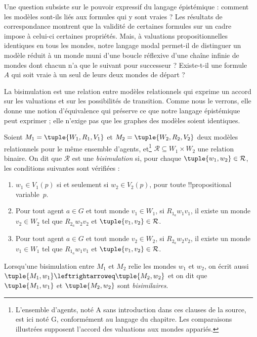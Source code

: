 \documentclass[../../../include/open-logic-section]{subfiles}
\begin{document}


Une question subsiste sur le pouvoir expressif du langage épistémique :
comment les modèles sont-ils liés aux formules qui y sont vraies ?
Les résultats de correspondance montrent que la validité de certaines
formules sur un cadre impose à celui-ci certaines propriétés. Mais,
à valuations propositionnelles identiques en tous les mondes, notre
langage modal permet-il de distinguer un modèle réduit à un monde
muni d'une boucle réflexive d'une chaîne infinie de mondes dont chacun
n'a que le suivant pour successeur ? Existe-t-il une formule $A$ qui
soit vraie à un seul de leurs deux mondes de départ ?

La bisimulation est une relation entre modèles relationnels qui
exprime un accord sur les valuations et sur les possibilités de
transition. Comme nous le verrons, elle donne une notion d'équivalence
qui préserve ce que notre langage épistémique peut exprimer ; elle
n'exige pas que les graphes des modèles soient identiques.

\begin{defn}[Bisimulation]
Soient $M_1 = \tuple{W_1, R_1, V_1}$ et $M_2 = \tuple{W_2, R_2, V_2}$
deux modèles relationnels pour le même ensemble d'agents, et\footnote{L'ensemble d'agents, noté A sans introduction dans ces clauses de la source, est ici noté G, conformément au langage du chapitre. Les comparaisons illustrées supposent l'accord des valuations aux mondes appariés.}
$\mathcal{R} \subseteq W_1 \times W_2$ une relation binaire.
On dit que $\mathcal{R}$ est une \emph{bisimulation} si, pour chaque
$\tuple{w_1, w_2} \in \mathcal{R}$, les conditions suivantes sont vérifiées :

\begin{enumerate}
  \item $w_1 \in V_1(p)$ si et seulement si $w_2 \in V_2(p)$,
  pour toute !!{propositional variable}~$p$.
  \item Pour tout agent $a \in G$ et tout monde $v_1 \in W_1$, si
  $R_{1_a} w_1 v_1$, il existe un monde $v_2 \in W_2$ tel que
  $R_{2_a} w_2 v_2$ et $\tuple{v_1, v_2} \in
  \mathcal{R}$.
  \item Pour tout agent $a \in G$ et tout monde $v_2 \in W_2$, si
   $R_{2_a} w_2 v_2$, il existe un monde $v_1 \in W_1$ tel que
   $R_{1_a} w_1 v_1$ et $\tuple{v_1, v_2} \in
   \mathcal{R}$.
\end{enumerate}

Lorsqu'une bisimulation entre $M_1$ et $M_2$ relie les mondes
$w_1$ et $w_2$, on écrit aussi $\tuple{M_1, w_1} \leftrightarroweq
\tuple{M_2, w_2}$ et on dit que $\tuple{M_1, w_1}$ et
$\tuple{M_2, w_2}$ sont \emph{bisimilaires}.
\end{defn}
\end{document}
